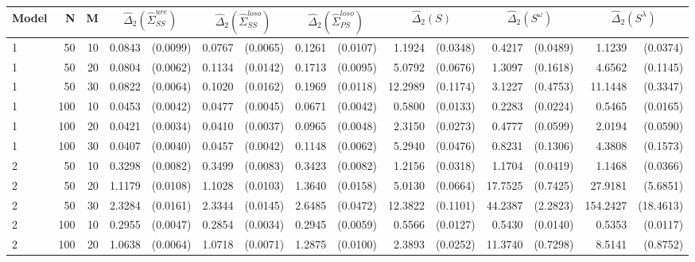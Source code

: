 \begin{table}[ht]
\centering
\begin{small}
\begin{tabular}{lrrrrrrrrrrrrrr}
Model & N & M & \multicolumn{2}{c}{$\hat{\Delta}_2(\hat{\Sigma}^{ure}_{SS})$} &  \multicolumn{2}{c}{$\hat{\Delta}_2(\hat{\Sigma}^{loso}_{SS})$}&  \multicolumn{2}{c}{$\hat{\Delta}_2(\hat{\Sigma}^{loso}_{PS})$} & \multicolumn{2}{c}{$\hat{\Delta}_2(S)$} &  \multicolumn{2}{c}{$\hat{\Delta}_2(S^\omega)$}  &  \multicolumn{2}{c}{$\hat{\Delta}_2(S^\lambda)$}   \\ 
  \hline
1 & 50 & 10 & 0.0843 & (0.0099) & 0.0767 & (0.0065) & 0.1261 & (0.0107) & 1.1924 & (0.0348) & 0.4217 & (0.0489) & 1.1239 & (0.0374) \\ 
  1 & 50 & 20 & 0.0804 & (0.0062) & 0.1134 & (0.0142) & 0.1713 & (0.0095) & 5.0792 & (0.0676) & 1.3097 & (0.1618) & 4.6562 & (0.1145) \\ 
  1 & 50 & 30 & 0.0822 & (0.0064) & 0.1020 & (0.0162) & 0.1969 & (0.0118) & 12.2989 & (0.1174) & 3.1227 & (0.4753) & 11.1448 & (0.3347) \\ 
  1 & 100 & 10 & 0.0453 & (0.0042) & 0.0477 & (0.0045) & 0.0671 & (0.0042) & 0.5800 & (0.0133) & 0.2283 & (0.0224) & 0.5465 & (0.0165) \\ 
  1 & 100 & 20 & 0.0421 & (0.0034) & 0.0410 & (0.0037) & 0.0965 & (0.0048) & 2.3150 & (0.0273) & 0.4777 & (0.0599) & 2.0194 & (0.0590) \\ 
  1 & 100 & 30 & 0.0407 & (0.0040) & 0.0457 & (0.0042) & 0.1148 & (0.0062) & 5.2940 & (0.0476) & 0.8231 & (0.1306) & 4.3808 & (0.1573) \\ 
  2 & 50 & 10 & 0.3298 & (0.0082) & 0.3499 & (0.0083) & 0.3423 & (0.0082) & 1.2156 & (0.0318) & 1.1704 & (0.0419) & 1.1468 & (0.0366) \\ 
  2 & 50 & 20 & 1.1179 & (0.0108) & 1.1028 & (0.0103) & 1.3640 & (0.0158) & 5.0130 & (0.0664) & 17.7525 & (0.7425) & 27.9181 & (5.6851) \\ 
  2 & 50 & 30 & 2.3284 & (0.0161) & 2.3344 & (0.0145) & 2.6485 & (0.0472) & 12.3822 & (0.1101) & 44.2387 & (2.2823) & 154.2427 & (18.4613) \\ 
  2 & 100 & 10 & 0.2955 & (0.0047) & 0.2854 & (0.0034) & 0.2945 & (0.0059) & 0.5566 & (0.0127) & 0.5430 & (0.0140) & 0.5353 & (0.0117) \\ 
  2 & 100 & 20 & 1.0638 & (0.0064) & 1.0718 & (0.0071) & 1.2875 & (0.0100) & 2.3893 & (0.0252) & 11.3740 & (0.7298) & 8.5141 & (0.8752) \\ 

\end{tabular}
\end{small}
\end{table}
